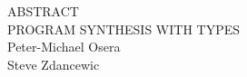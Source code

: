 \documentclass[12pt, oneside]{book}
\newcommand{\Title}{PROGRAM SYNTHESIS WITH TYPES}
\begin{document}
{%


\newpage
\begin{doublespace}
  \begin{centering}
    {\Large ABSTRACT} \\
    \Title{} \\
    Peter-Michael Osera \\
    Steve Zdancewic \\
  \end{centering}

\vspace*{0.5in}


\end{doublespace}



\newpage
\tableofcontents

\newpage
\listoffigures






\setcounter{page}{1}
\hypersetup{pageanchor=true}
\singlespaced




\normalsize








}
\end{document}
